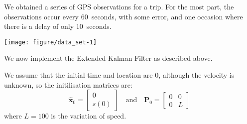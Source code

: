 \documentclass[11pt]{article}\usepackage[]{graphicx}\usepackage[]{color}
\newenvironment{knitrout}{}{} %
\begin{document}
We obtained a series of GPS observations for a trip.
For the most part, the observations occur every 60~seconds, with some error, and one
occasion where there is a delay of only 10~seconds.
\begin{knitrout}
\color{fgcolor}

{\centering \texttt{[image: figure/data\_set-1]} 

}



\end{knitrout}


We now implement the Extended Kalman Filter as described above.


We assume that the initial time and location are 0, although the velocity is unknown, so the initilisation matrices are:
\begin{equation*}
  \mathbf{\hat x}_0 = 
  \begin{bmatrix}
    0 \\ s(0)
  \end{bmatrix}
  \quad \text{and} \quad
  \mathbf{P}_0 =
  \begin{bmatrix}
    0 & 0 \\ 0 & L
  \end{bmatrix}
\end{equation*}
where $L = 100$ is the variation of speed.
\end{document}
